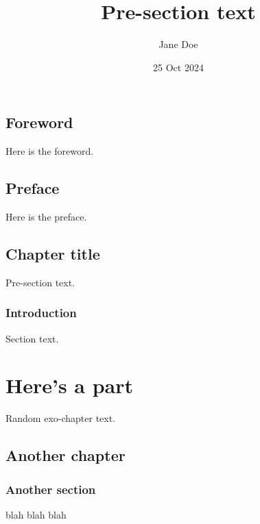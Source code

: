 \documentclass{amsbook}
\title{Pre-section text}
\author{Jane Doe}
\date{25 Oct 2024}
\begin{document}
\frontmatter

\tableofcontents

\makededication

\chapter*{Foreword}

Here is the foreword.

\chapter*{Preface}

Here is the preface.

\mainmatter

\chapter[XXX]{Chapter title}

Pre-section text.

\section{Introduction}

Section text.

\part{Here's a part}

Random exo-chapter text.

\chapter{Another chapter}

\section{Another section}

blah blah blah
\end{document}
